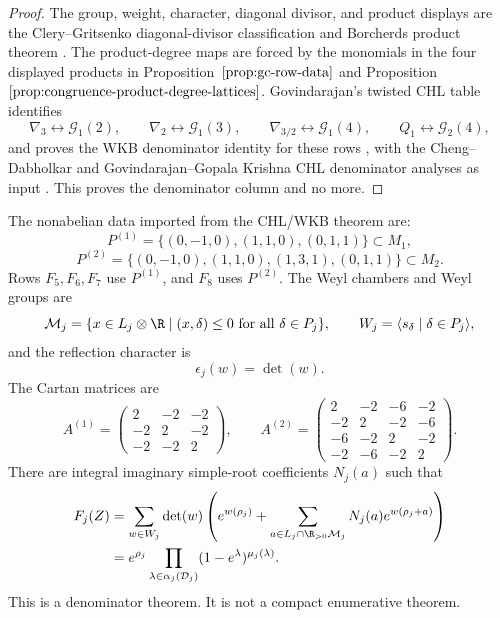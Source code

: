 \begin{proof}
The group, weight, character, diagonal divisor, and product displays are
the Clery--Gritsenko diagonal-divisor classification and Borcherds
product theorem \cite{GC}.  The product-degree maps are forced by the
monomials in the four displayed products in
Proposition~\(\ref{prop:gc-row-data}\) and
Proposition~\(\ref{prop:congruence-product-degree-lattices}\).
Govindarajan's twisted CHL table identifies
\[
\nabla_3\leftrightarrow\mathcal G_1(2),\qquad
\nabla_2\leftrightarrow\mathcal G_1(3),\qquad
\nabla_{3/2}\leftrightarrow\mathcal G_1(4),\qquad
Q_1\leftrightarrow\mathcal G_2(4),
\]
and proves the WKB denominator identity for these rows
\cite{Gov11BKM}, with the Cheng--Dabholkar and
Govindarajan--Gopala Krishna CHL denominator analyses as input
\cite{CD09BKM,GK09CHL,GK10Composite}.  This proves the denominator
column and no more.
\end{proof}

\begin{theorem}
\label{thm:agent12-chl-wkb-denominator-data}
The nonabelian data imported from the CHL/WKB theorem are:
\[
P^{(1)}=\{(0,-1,0),(1,1,0),(0,1,1)\}\subset M_1,
\]
\[
P^{(2)}=\{(0,-1,0),(1,1,0),(1,3,1),(0,1,1)\}\subset M_2.
\]
Rows \(F_5,F_6,F_7\) use \(P^{(1)}\), and \(F_8\) uses \(P^{(2)}\).
The Weyl chambers and Weyl groups are
\[
\mathcal M_j=\{x\in L_j\otimes\R\mid (x,\delta)\le0
\ \mathrm{for\ all}\ \delta\in P_j\},\qquad
W_j=\langle s_\delta\mid\delta\in P_j\rangle,
\]
and the reflection character is
\[
\epsilon_j(w)=\det(w).
\]
The Cartan matrices are
\[
A^{(1)}=
\begin{pmatrix}
2&-2&-2\\
-2&2&-2\\
-2&-2&2
\end{pmatrix},
\qquad
A^{(2)}=
\begin{pmatrix}
2&-2&-6&-2\\
-2&2&-2&-6\\
-6&-2&2&-2\\
-2&-6&-2&2
\end{pmatrix}.
\]
There are integral imaginary simple-root coefficients \(N_j(a)\) such
that
\[
\begin{aligned}
F_j(Z)
&=\sum_{w\in W_j}\det(w)
\left(e^{w(\rho_j)}
+\sum_{a\in L_j\cap\R_{>0}\mathcal M_j}
N_j(a)e^{w(\rho_j+a)}\right)\\
&=e^{\rho_j}
\prod_{\lambda\in\alpha_j(\mathcal D_j)}
(1-e^\lambda)^{\mu_j(\lambda)}.
\end{aligned}
\]
This is a denominator theorem.  It is not a compact enumerative theorem.
\end{theorem}


